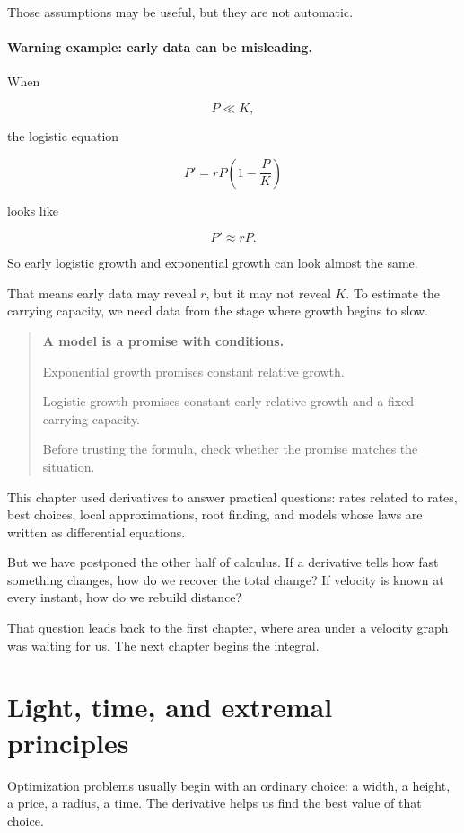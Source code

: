 Those assumptions may be useful, but they are not automatic.

\paragraph{Warning example: early data can be misleading.}
When

\[
P\ll K,
\]

the logistic equation

\[
P'=rP\left(1-\frac{P}{K}\right)
\]

looks like

\[
P'\approx rP.
\]

So early logistic growth and exponential growth can look almost the same.

That means early data may reveal \(r\), but it may not reveal \(K\).  To estimate the
carrying capacity, we need data from the stage where growth begins to slow.

\begin{quote}
\textbf{A model is a promise with conditions.}

Exponential growth promises constant relative growth.

Logistic growth promises constant early relative growth and a fixed carrying capacity.

Before trusting the formula, check whether the promise matches the situation.
\end{quote}

This chapter used derivatives to answer practical questions: rates related to rates,
best choices, local approximations, root finding, and models whose laws are written
as differential equations.

But we have postponed the other half of calculus.  If a derivative tells how fast
something changes, how do we recover the total change?  If velocity is known at every
instant, how do we rebuild distance?

That question leads back to the first chapter, where area under a velocity graph was
waiting for us.  The next chapter begins the integral.
\section{Light, time, and extremal principles}
\label{sec:light-time-extremal-principles}

Optimization problems usually begin with an ordinary choice: a width, a height, a
price, a radius, a time.  The derivative helps us find the best value of that choice.

